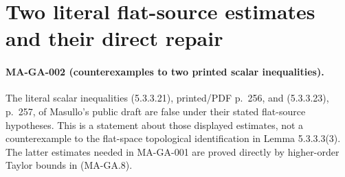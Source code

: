 \section{Two literal flat-source estimates and their direct repair}
\label{sec:general-flat-source-scope}

\paragraph{MA-GA-002 (counterexamples to two printed scalar inequalities).}
The literal scalar inequalities (5.3.3.21), printed/PDF
p.~256, and (5.3.3.23), p.~257, of Masullo's public draft
are false under their stated flat-source hypotheses.
This is a statement about those displayed estimates,
not a counterexample to the flat-space topological
identification in Lemma 5.3.3.3(3).  The latter estimates
needed in MA-GA-001 are proved directly by higher-order
Taylor bounds in (MA-GA.8).

